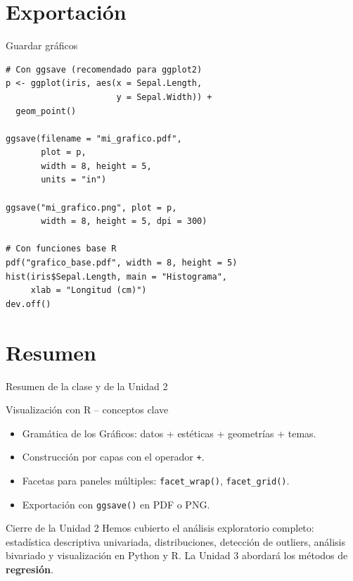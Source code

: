 \documentclass[aspectratio=169]{beamer}
\begin{document}
\section{Exportación}

\begin{frame}[fragile]{Guardar gráficos}
\begin{lstlisting}[style=rcode]
# Con ggsave (recomendado para ggplot2)
p <- ggplot(iris, aes(x = Sepal.Length,
                      y = Sepal.Width)) +
  geom_point()

ggsave(filename = "mi_grafico.pdf",
       plot = p,
       width = 8, height = 5,
       units = "in")

ggsave("mi_grafico.png", plot = p,
       width = 8, height = 5, dpi = 300)

# Con funciones base R
pdf("grafico_base.pdf", width = 8, height = 5)
hist(iris$Sepal.Length, main = "Histograma",
     xlab = "Longitud (cm)")
dev.off()
\end{lstlisting}
\end{frame}

\section{Resumen}

\begin{frame}{Resumen de la clase y de la Unidad 2}
  \begin{block}{Visualización con R -- conceptos clave}
    \begin{itemize}
      \item Gramática de los Gráficos: datos + estéticas + geometrías + temas.
      \item Construcción por capas con el operador \texttt{+}.
      \item Facetas para paneles múltiples: \texttt{facet\_wrap()}, \texttt{facet\_grid()}.
      \item Exportación con \texttt{ggsave()} en PDF o PNG.
    \end{itemize}
  \end{block}
  \bigskip
  \begin{block}{Cierre de la Unidad 2}
    Hemos cubierto el análisis exploratorio completo: estadística descriptiva univariada, distribuciones, detección de outliers, análisis bivariado y visualización en Python y R.
    La Unidad 3 abordará los métodos de \textbf{regresión}.
  \end{block}
\end{frame}
\end{document}
